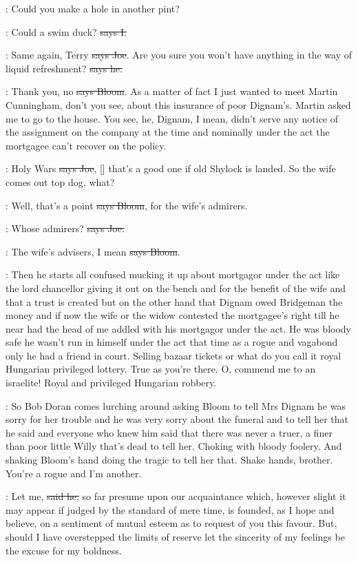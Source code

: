 \joe:
Could you make a hole in another pint?

:
Could a swim duck? \sout{says I.}

\joe:
Same again, Terry \sout{says Joe}.
Are you sure you won't have anything in the
way of liquid refreshment? \sout{says he.}

\Bloom:
Thank you, no \sout{says Bloom}.
As a matter of fact I just wanted to meet
Martin Cunningham, don't you see, about this insurance of poor Dignam's.
Martin asked me to go to the house. You see, he, Dignam, I mean, didn't
serve any notice of the assignment on the company at the time and
nominally under the act the mortgagee can't recover on the policy.

\joe:
Holy Wars \sout{says Joe},
[] that's a good one if old Shylock is
landed. So the wife comes out top dog, what?

\Bloom:
Well, that's a point \sout{says Bloom},
for the wife's admirers.

\joe:
Whose admirers? \sout{says Joe.}

\Bloom:
The wife's advisers, I mean \sout{says Bloom}.

\Nq:
Then he starts all confused
mucking it up about mortgagor under the act
like the lord chancellor giving it out on the bench and for the benefit of
the wife and that a trust is created but on the other hand that Dignam
owed Bridgeman the money and if now the wife or the widow contested the
mortgagee's right till he near had the head of me addled with his
mortgagor under the act. He was bloody safe he wasn't run in himself under
the act that time as a rogue and vagabond only he had a friend in court.
Selling bazaar tickets or what do you call it royal Hungarian privileged
lottery. True as you're there. O, commend me to an israelite! Royal and
privileged Hungarian robbery.

\Nq:
So Bob Doran comes lurching around
asking Bloom to tell Mrs
Dignam he was sorry for her trouble and he was very sorry about the
funeral and to tell her that he said and everyone who knew him said that
there was never a truer, a finer than poor little Willy that's dead to tell
her. Choking with bloody foolery. And shaking Bloom's hand doing the
tragic to tell her that. Shake hands, brother. You're a rogue and I'm
another.

\doran:
Let me, \sout{said he,}
so far presume upon our acquaintance which, however
slight it may appear if judged by the standard of mere time, is founded,
as I hope and believe, on a sentiment of mutual esteem as to request of
you this favour. But, should I have overstepped the limits of reserve
let the sincerity of my feelings
be the excuse for my boldness.

